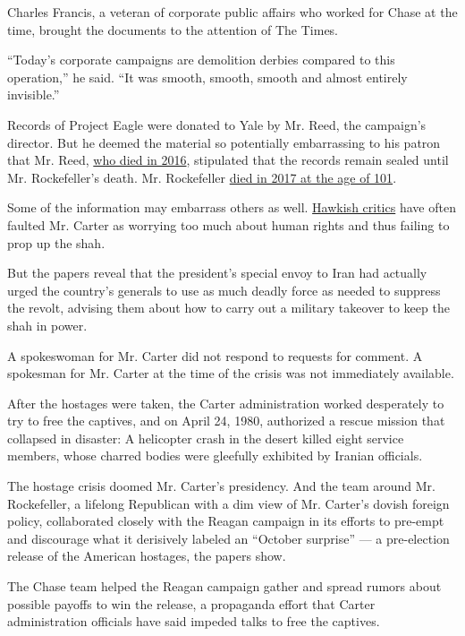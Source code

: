 Charles Francis, a veteran of corporate public affairs who worked for
Chase at the time, brought the documents to the attention of The Times.

``Today's corporate campaigns are demolition derbies compared to this
operation,'' he said. ``It was smooth, smooth, smooth and almost
entirely invisible.''

Records of Project Eagle were donated to Yale by Mr. Reed, the
campaign's director. But he deemed the material so potentially
embarrassing to his patron that Mr. Reed,
\href{https://www.nytimes.com/2016/10/05/us/joseph-verner-reed-jr-protocol-chief-who-presided-over-colorful-gaffe-dies-at-78.html}{who
died in 2016}, stipulated that the records remain sealed until Mr.
Rockefeller's death. Mr. Rockefeller
\href{https://www.nytimes.com/2017/03/20/business/david-rockefeller-dead-chase-manhattan-banker.html}{died
in 2017 at the age of 101}.

Some of the information may embarrass others as well.
\href{https://www.commentarymagazine.com/articles/dictatorships-double-standards/}{Hawkish
critics} have often faulted Mr. Carter as worrying too much about human
rights and thus failing to prop up the shah.

But the papers reveal that the president's special envoy to Iran had
actually urged the country's generals to use as much deadly force as
needed to suppress the revolt, advising them about how to carry out a
military takeover to keep the shah in power.

A spokeswoman for Mr. Carter did not respond to requests for comment. A
spokesman for Mr. Carter at the time of the crisis was not immediately
available.

After the hostages were taken, the Carter administration worked
desperately to try to free the captives, and on April 24, 1980,
authorized a rescue mission that collapsed in disaster: A helicopter
crash in the desert killed eight service members, whose charred bodies
were gleefully exhibited by Iranian officials.

The hostage crisis doomed Mr. Carter's presidency. And the team around
Mr. Rockefeller, a lifelong Republican with a dim view of Mr. Carter's
dovish foreign policy, collaborated closely with the Reagan campaign in
its efforts to pre-empt and discourage what it derisively labeled an
``October surprise'' --- a pre-election release of the American
hostages, the papers show.

The Chase team helped the Reagan campaign gather and spread rumors about
possible payoffs to win the release, a propaganda effort that Carter
administration officials have said impeded talks to free the captives.

